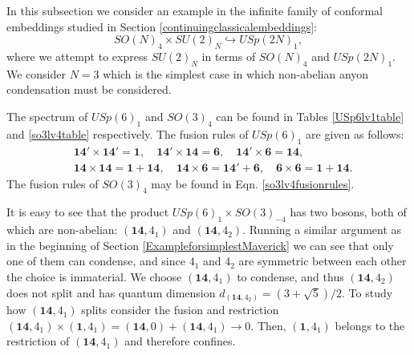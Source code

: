 \documentclass[11pt]{article}
\numberwithin{equation}{section}
\begin{document}
In this subsection we consider an example in the infinite family of conformal embeddings studied in Section \ref{continuingclassicalembeddings}:
\begin{equation}
     SO(N)_{4} \times SU(2)_{N} \hookrightarrow USp(2N)_{1},
\end{equation}
where we attempt to express $SU(2)_{N}$ in terms of $SO(N)_{4}$ and $USp(2N)_{1}$. We consider $N=3$ which is the simplest case in which non-abelian anyon condensation must be considered.

The spectrum of $USp(6)_{1}$ and $SO(3)_{4}$ can be found in Tables \ref{USp6lv1table} and \ref{so3lv4table} respectively. The fusion rules of $USp(6)_{1}$ are given as follows:
\begin{align}
    &\mathbf{14}' \times \mathbf{14}' = \mathbf{1}, \quad \mathbf{14}' \times \mathbf{14} = \mathbf{6}, \quad \mathbf{14}' \times \mathbf{6} = \mathbf{14}, \nonumber \\[0.3cm]
    &\mathbf{14} \times \mathbf{14} = \mathbf{1} + \mathbf{14}, \quad \mathbf{14} \times \mathbf{6} = \mathbf{14}' + \mathbf{6}, \quad \mathbf{6} \times \mathbf{6} = \mathbf{1} + \mathbf{14}.
\end{align}
The fusion rules of $SO(3)_{4}$ may be found in Eqn. \eqref{so3lv4fusionrules}.

It is easy to see that the product $USp(6)_{1} \times SO(3)_{-4}$ has two bosons, both of which are non-abelian: $(\mathbf{14},4_{1})$ and $(\mathbf{14},4_{2})$. Running a similar argument as in the beginning of Section \ref{ExampleforsimplestMaverick} we can see that only one of them can condense, and since $4_{1}$ and $4_{2}$ are symmetric between each other the choice is immaterial. We choose $(\mathbf{14},4_{1})$ to condense, and thus $(\mathbf{14},4_{2})$ does not split and has quantum dimension $d_{(\mathbf{14},4_{2})} = (3+\sqrt{5})/2$. To study how $(\mathbf{14},4_{1})$ splits consider the fusion and restriction $(\mathbf{14},4_{1}) \times (\mathbf{1},4_{1}) =  (\mathbf{14}, 0) + (\mathbf{14},4_{1}) \to 0$. Then, $(\mathbf{1},4_{1})$ belongs to the restriction of $(\mathbf{14},4_{1})$ and therefore confines.
\end{document}
